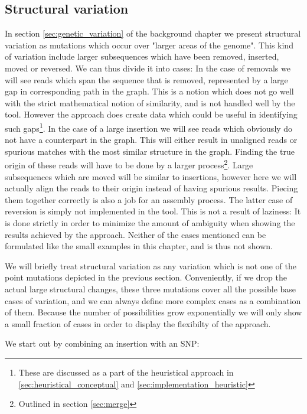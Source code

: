 \documentclass[thesis.tex]{subfiles}
\begin{document}
\subsection*{Structural variation}
In section \ref{sec:genetic_variation} of the background chapter we present structural variation as mutations which occur over "larger areas of the genome". This kind of variation include larger subsequences which have been removed, inserted, moved or reversed. We can thus divide it into cases: In the case of removals we will see reads which span the sequence that is removed, represented by a large gap in corresponding path in the graph. This is a notion which does not go well with the strict mathematical notion of similarity, and is not handled well by the tool. However the approach does create data which could be useful in identifying such gaps\footnote{These are discussed as a part of the heuristical approach in \ref{sec:heuristical_conceptual} and \ref{sec:implementation_heuristic}}. In the case of a large insertion we will see reads which obviously do not have a counterpart in the graph. This will either result in unaligned reads or spurious matches with the most similar structure in the graph. Finding the true origin of these reads will have to be done by a larger process\footnote{Outlined in section \ref{sec:merge}}. Large subsequences which are moved will be similar to insertions, however here we will actually align the reads to their origin instead of having spurious results. Piecing them together correctly is also a job for an assembly process. The latter case of reversion is simply not implemented in the tool. This is not a result of laziness: It is done strictly in order to minimize the amount of ambiguity when showing the results achieved by the approach. Neither of the cases mentioned can be formulated like the small examples in this chapter, and is thus not shown.\\
\par\noindent
We will briefly treat structural variation as any variation which is not one of the point mutations depicted in the previous section. Conveniently, if we drop the actual large structural changes, these three mutations cover all the possible base cases of variation, and we can always define more complex cases as a combination of them. Because the number of possibilities grow exponentially we will only show a small fraction of cases in order to display the flexibilty of the approach.\\
\par\noindent
We start out by combining an insertion with an SNP:\\
\end{document}
